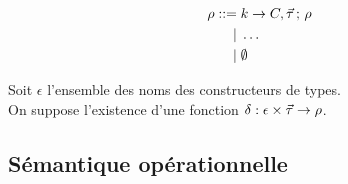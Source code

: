 \begin{align*}
  \rho ::=& \; k \rightarrow C, \vec{\tau} \,;\, \rho
  \\ |& \; \ldots
  \\ |& \; \emptyset
\end{align*}

Soit $\epsilon$ l'ensemble des noms des constructeurs de types. \\
On suppose l'existence d'une fonction 
$\delta : \epsilon \times \vec{\tau} \to \rho$.


\subsection{Sémantique opérationnelle}

